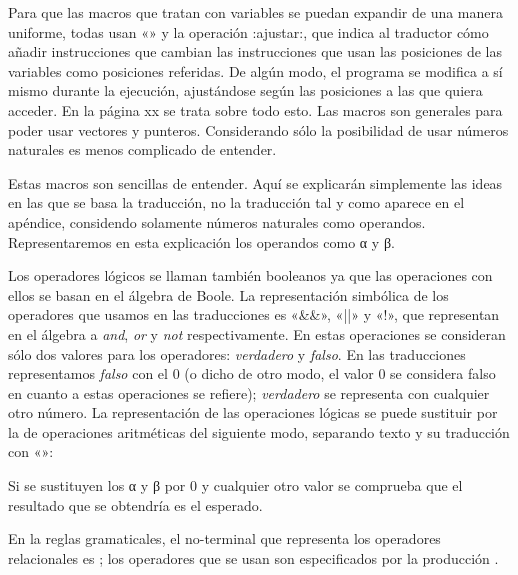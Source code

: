 Para que las macros que tratan con variables se puedan expandir de una ma\-ne\-ra uniforme, todas
usan «» y la operación {\fcode:ajustar:}, que indica al traductor cómo añadir
instrucciones que cambian las instrucciones que usan las posiciones de las variables como posiciones
referidas. De algún modo, el programa se modifica a sí mismo durante la ejecución, ajustándose según
las posiciones a las que quiera acceder. En la página xx se trata sobre todo esto. Las macros son
generales para poder usar vectores y punteros. Considerando sólo la posibilidad de usar números
naturales es menos complicado de entender.

%
Estas macros son sencillas de entender. Aquí se explicarán simplemente las ideas en las que se basa
la traducción, no la traducción tal y como aparece en el apéndice, considendo solamente números
naturales como operandos. Representaremos en esta explicación los operandos como {\fgramatnoterm α}
y {\fgramatnoterm β}.

Los operadores lógicos se llaman también booleanos ya que las operaciones con ellos se basan en el
álgebra de Boole. La representación simbólica de los ope\-ra\-dores que usamos en las traducciones
es «\&\&», «||» y «!», que representan en el álgebra a {\it and}, {\it or} y {\it not}
respectivamente. En estas operaciones se consideran sólo dos valores para los operadores: {\it
verdadero} y {\it falso}. En las traducciones re\-pre\-sentamos {\it falso} con el 0 (o dicho de otro modo, el
valor 0 se considera falso en cuanto a estas operaciones se refiere); {\it verdadero} se representa
con cualquier otro número. La representación de las operaciones lógicas se puede sustituir por la de
operaciones aritméticas del siguiente modo, separando texto y su traducción con «\flechagram{}»:
\listraducciones
\noindent{}\par
\noindent{}\par
\noindent{}
\finlistatrad
Si se sustituyen los α y β por 0 y cualquier otro valor se comprueba que el resultado que se
obtendría es el esperado.

En la reglas gramaticales, el no-terminal que representa los operadores relacionales
es ; los operadores que se usan son especificados por la producción
\encaje
{} \fin .
\finencaje

